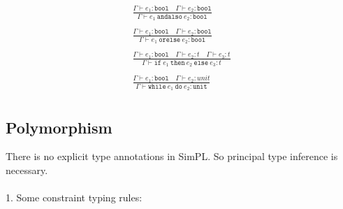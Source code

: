 \documentclass{article}
\begin{document}
\begin{figure}[htb]
{\begin{minipage}{0.6\textwidth}
\begin{align*}
			\\\\
			\tag{\sc T-AndAlso}
			\frac{\Gamma\vdash e_1:\texttt{bool} \quad \Gamma\vdash e_2:\texttt{bool}}
			{\Gamma\vdash e_1\ \texttt{andalso}\ e_2 : \texttt{bool}}
			\\\\
			\tag{\sc T-OrElse}
			\frac{\Gamma\vdash e_1:\texttt{bool} \quad \Gamma\vdash e_2:\texttt{bool}}
			{\Gamma\vdash e_1\ \texttt{orelse}\ e_2 : \texttt{bool}}
			\\\\
			\tag{\sc T-Cond}
			\frac{\Gamma\vdash e_1:\texttt{bool} \quad \Gamma\vdash e_2:t \quad \Gamma\vdash e_3:t}
			{\Gamma\vdash \texttt{if}\ e_1\ \texttt{then}\ e_2\ \texttt{else}\ e_3 : t}
			\\\\
			\tag{\sc T-Loop}
			\frac{\Gamma\vdash e_1:\texttt{bool} \quad \Gamma\vdash e_2:unit}
			{\Gamma\vdash \texttt{while}\ e_1\ \texttt{do}\ e_2 : \texttt{unit}}
			\\
			\end{align*}
	\end{minipage}}
\end{figure}

\newpage

\subsection{Polymorphism}

There is no explicit type annotations in SimPL. So principal type inference is necessary.
~\\~\\
1. Some constraint typing rules:
\end{document}
